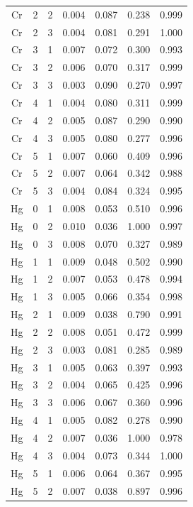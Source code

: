 \documentclass[ms, hidelinks]{uncgdissertationexp}
\theoremstyle{plain}
\theoremstyle{definition}
\theoremstyle{remark}
\begin{document}
\begin{longtable}{ccccccc}
Cr & 2 & 2 & 0.004 & 0.087 & 0.238 & 0.999\\
\rowcolor{gray!6}  Cr & 2 & 3 & 0.004 & 0.081 & 0.291 & 1.000\\
Cr & 3 & 1 & 0.007 & 0.072 & 0.300 & 0.993\\
\rowcolor{gray!6}  Cr & 3 & 2 & 0.006 & 0.070 & 0.317 & 0.999\\
Cr & 3 & 3 & 0.003 & 0.090 & 0.270 & 0.997\\
\rowcolor{gray!6}  Cr & 4 & 1 & 0.004 & 0.080 & 0.311 & 0.999\\
Cr & 4 & 2 & 0.005 & 0.087 & 0.290 & 0.990\\
\rowcolor{gray!6}  Cr & 4 & 3 & 0.005 & 0.080 & 0.277 & 0.996\\
Cr & 5 & 1 & 0.007 & 0.060 & 0.409 & 0.996\\
\rowcolor{gray!6}  Cr & 5 & 2 & 0.007 & 0.064 & 0.342 & 0.988\\
Cr & 5 & 3 & 0.004 & 0.084 & 0.324 & 0.995\\
\rowcolor{gray!6}  Hg & 0 & 1 & 0.008 & 0.053 & 0.510 & 0.996\\
Hg & 0 & 2 & 0.010 & 0.036 & 1.000 & 0.997\\
\rowcolor{gray!6}  Hg & 0 & 3 & 0.008 & 0.070 & 0.327 & 0.989\\
Hg & 1 & 1 & 0.009 & 0.048 & 0.502 & 0.990\\
\rowcolor{gray!6}  Hg & 1 & 2 & 0.007 & 0.053 & 0.478 & 0.994\\
Hg & 1 & 3 & 0.005 & 0.066 & 0.354 & 0.998\\
\rowcolor{gray!6}  Hg & 2 & 1 & 0.009 & 0.038 & 0.790 & 0.991\\
Hg & 2 & 2 & 0.008 & 0.051 & 0.472 & 0.999\\
\rowcolor{gray!6}  Hg & 2 & 3 & 0.003 & 0.081 & 0.285 & 0.989\\
Hg & 3 & 1 & 0.005 & 0.063 & 0.397 & 0.993\\
\rowcolor{gray!6}  Hg & 3 & 2 & 0.004 & 0.065 & 0.425 & 0.996\\
Hg & 3 & 3 & 0.006 & 0.067 & 0.360 & 0.996\\
\rowcolor{gray!6}  Hg & 4 & 1 & 0.005 & 0.082 & 0.278 & 0.990\\
Hg & 4 & 2 & 0.007 & 0.036 & 1.000 & 0.978\\
\rowcolor{gray!6}  Hg & 4 & 3 & 0.004 & 0.073 & 0.344 & 1.000\\
Hg & 5 & 1 & 0.006 & 0.064 & 0.367 & 0.995\\
\rowcolor{gray!6}  Hg & 5 & 2 & 0.007 & 0.038 & 0.897 & 0.996\\

\end{longtable}
\end{document}
